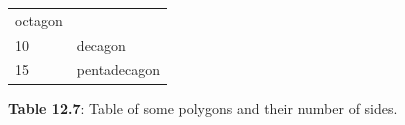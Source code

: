 {{\begin{center}
\begin{xtabular}[t]{|l|l|}
        octagon%
     \tabularnewline{}
        10 &
        decagon%
     \tabularnewline{}
        15 &
        pentadecagon%
     \tabularnewline{}
    \end{xtabular}
      \end{center}
    \begin{center}{\small\bfseries Table 12.7}: Table of some polygons and their number of sides.\end{center}
          } %
        }{%
        }
